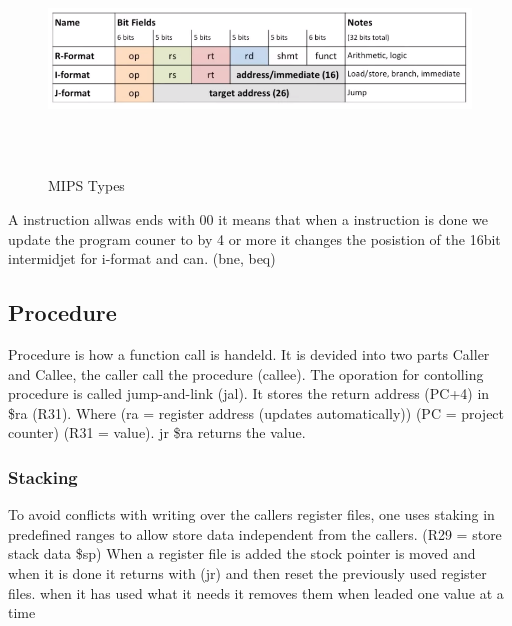 \begin{figure}[h]
    \vspace{10mm}
    \centering
    \includegraphics[width=17cm, height=6cm]{image/mips-types.png} 
    \caption{MIPS Types}
\end{figure}

A instruction allwas ends with 00 it means that when a instruction is done we update the program couner
to by 4 or more it changes the posistion of the 16bit intermidjet for i-format and can. (bne, beq)

\subsection{Procedure}
Procedure is how a function call is handeld. It is devided into two parts Caller and Callee,
the caller call the procedure (callee).
The oporation for contolling procedure is called jump-and-link (jal).
It stores the return address (PC+4) in \$ra (R31).
Where (ra = register address (updates automatically))
(PC = project counter)
(R31 = value).
jr \$ra returns the value.

\subsubsection{Stacking}
To avoid conflicts with writing over the callers register files, one uses staking in predefined
ranges to allow store data independent from the callers. 
(R29 =  store stack data \$sp)
When a register file is added the stock pointer is moved and when it is done it returns with (jr) and then
reset the previously used register files.
when it has used what it needs it removes them when leaded one value at a time


